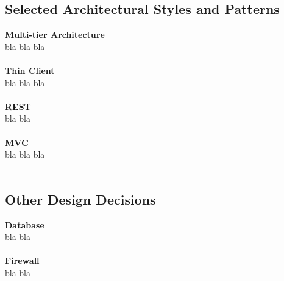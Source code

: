 \documentclass{article}
\begin{document}
	
	\subsection{Selected Architectural Styles and Patterns}
	{\bf Multi-tier Architecture} \\
	bla bla bla 
	\\ \\
	{\bf Thin Client} \\
	bla bla bla 
	\\ \\
	{\bf REST} \\
	bla bla 
	\\ \\ 
	{\bf MVC} \\
	bla bla bla
	\\ \\ 
	
	\subsection{Other Design Decisions}
	{\bf Database} \\
	bla bla 
	\\ \\ 
	{\bf Firewall} \\ 
	bla bla 
	\\ \\
	
\pagebreak

\end{document}
